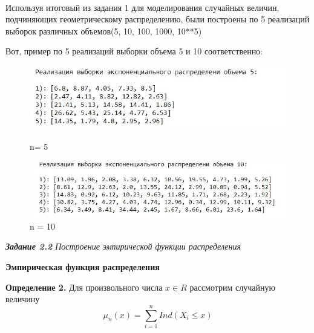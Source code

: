 \documentclass[a4paper,12pt, oneside]{book}
\begin{document}
\\
\vspace{5mm}


Используя итоговый из задания 1 для моделирования случайных величин, подчиняющих геометрическому распределению, были построены по 5 реализаций выборок различных объемов(5, 10, 100, 1000, 10**5)
\vspace{5mm}

Вот, пример по  5 реализаций выборки объема 5 и  10 соответственно:

\begin{figure}[h]
	\begin{center}
		\begin{minipage}[h]{0.4\linewidth}
			\includegraphics[width=1\linewidth]{vibor_ex_5.jpg}
			\caption{n= 5} %
			\label{ris:experimoriginal} %
		\end{minipage}
		\hfill
		\begin{minipage}[h]{0.4\linewidth}
			\includegraphics[width=1\linewidth]{vibor_ex_10.jpg}
			\caption{n = 10}
			\label{ris:experimcoded}
		\end{minipage}
	\end{center}
\end{figure}

\newpage
{\large\textit{\textbf{Задание 2.2} Построение эмпирической функции распределения}}


\vspace{5mm}
	\large{\textbf{Эмпирическая функция распределения}}
\vspace{5mm}

\normalsize{\textbf{Определение 2.}} Для произвольного числа $x \in R$ рассмотрим случайную величину
$$
\mu_n(x) = \sum\limits_{i=1}^n Ind(X_i \leq x )
$$
\end{document}
